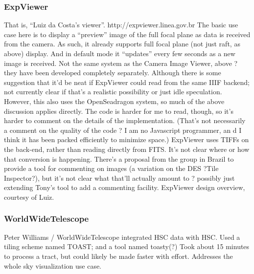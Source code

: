 \subsubsection{ExpViewer}
That is, ``Luiz da Costa's viewer''.
http://expviewer.linea.gov.br
The basic use case here is to display a ``preview'' image of the full focal plane as data is received from the camera.
As such, it already supports full focal plane (not just raft, as above) display.
And in default mode it ``updates'' every few seconds as a new image is received.
Not the same system as the Camera Image Viewer, above ? they have been developed completely separately.
Although there is some suggestion that it'd be neat if ExpViewer could read from the same IIIF backend; not currently clear if that's a realistic possibility or just idle speculation.
However, this also uses the OpenSeadragon system, so much of the above discussion applies directly.
The code is harder for me to read, though, so it's harder to comment on the details of the implementation.
(That's not necessarily a comment on the quality of the code ? I am no Javascript programmer, an
d I think it has been packed efficiently to minimize space.)
ExpViewer uses TIFFs on the back-end, rather than reading directly from FITS.
It's not clear where or how that conversion is happening.
There's a proposal from the group in Brazil to provide a tool for commenting on images (a variation on the DES ?Tile Inspector?), but it's not clear what that'll actually amount to ? possibly just extending Tony's tool to add a commenting facility.
ExpViewer design overview, courtesy of Luiz.

\subsubsection{WorldWideTelescope}
Peter Williams / WorldWideTelescope integrated HSC data with HSC.
Used a tiling scheme named TOAST; and a tool named toasty(?)
Took about 15 minutes to process a tract, but could likely be made faster with effort.
Addresses the whole sky visualization use case.


